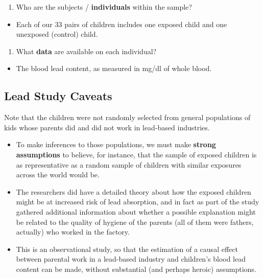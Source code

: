 \documentclass[
]{book}
\providecommand{\tightlist}{%
  \setlength{\itemsep}{0pt}\setlength{\parskip}{0pt}}
\begin{document}
\begin{enumerate}
\def\labelenumi{\arabic{enumi}.}
\setcounter{enumi}{2}
\tightlist
\item
  Who are the subjects / \textbf{individuals} within the sample?
\end{enumerate}

\begin{itemize}
\tightlist
\item
  Each of our 33 pairs of children includes one exposed child and one unexposed (control) child.
\end{itemize}

\begin{enumerate}
\def\labelenumi{\arabic{enumi}.}
\setcounter{enumi}{3}
\tightlist
\item
  What \textbf{data} are available on each individual?
\end{enumerate}

\begin{itemize}
\tightlist
\item
  The blood lead content, as measured in mg/dl of whole blood.
\end{itemize}

\hypertarget{lead-study-caveats}{%
\subsection{Lead Study Caveats}\label{lead-study-caveats}}

Note that the children were not randomly selected from general populations of kids whose parents did and did not work in lead-based industries.

\begin{itemize}
\tightlist
\item
  To make inferences to those populations, we must make \textbf{strong assumptions} to believe, for instance, that the sample of exposed children is as representative as a random sample of children with similar exposures across the world would be.
\item
  The researchers did have a detailed theory about how the exposed children might be at increased risk of lead absorption, and in fact as part of the study gathered additional information about whether a possible explanation might be related to the quality of hygiene of the parents (all of them were fathers, actually) who worked in the factory.
\item
  This is an observational study, so that the estimation of a causal effect between parental work in a lead-based industry and children's blood lead content can be made, without substantial (and perhaps heroic) assumptions.
\end{itemize}
\end{document}
